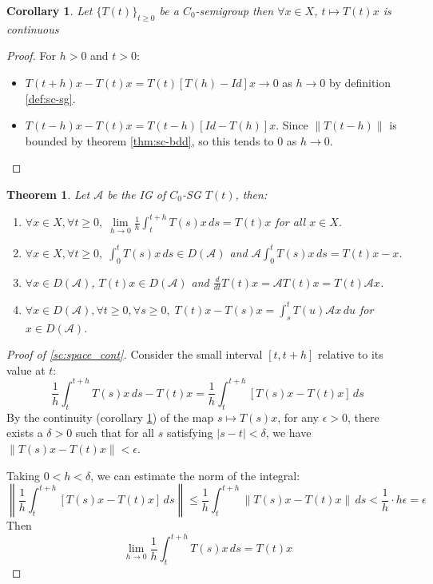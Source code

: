 \documentclass[12pt, oneside]{book}
\newtheorem{coro}{Corollary}[section]
\newtheorem*{theo*}{Theorem}
\newcommand{\norm}[1]{\left\lVert#1\right\rVert}
\newcommand{\A}{\mathscr{A}}
\begin{document}
\begin{coro} \label{sc:cont}
Let $\{T(t)\}_{t \ge 0}$ be a $C_0$-semigroup then $\forall x \in X$, $t \mapsto T(t)x$ is continuous
\end{coro}

\begin{proof}
For $h > 0$ and $t > 0$:
\begin{itemize}
\item $T(t+h)x - T(t)x = T(t)[T(h) - Id]x \to 0$ as $h \to 0$ by definition \ref{def:sc-sg}.
\item $T(t-h)x - T(t)x = T(t-h)[Id - T(h)]x$. Since $\norm{T(t-h)}$ is bounded by theorem \ref{thm:sc-bdd}, so this tends to $0$ as $h \to 0$.
\end{itemize}
\end{proof}

\begin{theo*}
Let $\A$ be the IG of $C_0$-SG $T(t)$, then:

\begin{enumerate}[label=\bfseries \thesection.\arabic*, 
                 before=\setcounter{enumi}{\value{theo}}, 
                 after=\setcounter{theo}{\value{enumi}}]
	    \item \label{sc:space_cont} $\forall x \in X, \forall t \ge 0, \; \lim\limits_{h \to 0} \frac{1}{h} \int_t^{t+h} T(s)x \, ds = T(t)x$ for all $x \in X$.
	    \item \label{sc:img} $\forall x \in X, \forall t \ge 0, \; \int_0^t T(s)x \, ds \in D(\A)$ and $\A \int_0^t T(s)x \, ds = T(t)x - x$.
	    \item \label{sc:diff_commute} $\forall x \in D(\A)$, $T(t)x \in D(\A)$ and $\frac{d}{dt} T(t)x = \A T(t)x = T(t)\A x$.
	    \item \label{sc:ftc} $\forall x \in D(\A), \forall t \ge 0, \forall s \ge 0, \; T(t)x - T(s)x = \int_s^t T(u)\A x \, du$ for $x \in D(\A)$.
\end{enumerate}
\end{theo*}

\begin{proof}[Proof of \ref{sc:space_cont}]
Consider the small interval $[t, t+h]$ relative to its value at $t$:
$$
    \frac{1}{h} \int_{t}^{t+h} T(s)x \, ds - T(t)x = \frac{1}{h} \int_{t}^{t+h} [T(s)x - T(t)x] \, ds \text{}
$$
By the continuity (corollary \ref{sc:cont}) of the map $s \mapsto T(s)x$, for any $\epsilon > 0$, there exists a $\delta > 0$ such that for all $s$ satisfying $|s - t| < \delta$, we have $\norm{T(s)x - T(t)x} < \epsilon$.

Taking $0 < h < \delta$, we can estimate the norm of the integral:
$$
	\norm{\frac{1}{h} \int_{t}^{t+h} [T(s)x - T(t)x] \, ds } \le \frac{1}{h} \int_{t}^{t+h} \norm{T(s)x - T(t)x} \, ds < \frac{1}{h} \cdot h\epsilon = \epsilon \text{}
$$
Then
$$
    \lim_{h \to 0} \frac{1}{h} \int_{t}^{t+h} T(s)x \, ds = T(t)x \text{}
$$
\end{proof}
\end{document}
